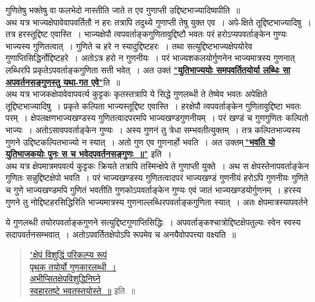 \documentclass[11pt, openany]{book}
\begin{document}
\newpage%

\noindent गुणितेषु भक्तेषु वा फलभेदो नास्तीति जाते त एव गुणाप्ती उद्दिष्टभाज्यादिष्वपीति~॥ \\

\vspace{-3mm}
 अथ यत्र भाज्यक्षेपावेवापवर्तितौ न हरः तत्रापि तदुथ्ये गुणाप्ती तेषु 
युक्त एव~। अपे-क्षिते तूद्दिष्टभाज्यादिषु~। तत्र हरस्तूद्दिष्ट एवास्ति~।
भाज्यक्षेपौ त्वपवर्ताङ्कगुणितावुद्दिष्टौ भवतः परं हरोऽप्यपवर्ताङ्केन गुण्यः
भाज्यस्य गुणितत्वात्~। गुणिते च हरे न स्यादुद्दिष्टहरः~। तथा सत्युद्दिष्टभाज्यक्षेपयोरेव 
गुणाप्तिसिद्धिर्नोद्दिष्टहरे~। अतोऽत्र हरो न गुणनीयः~। परं भाज्यशकलयोर्गुणनेन भाज्यमात्रस्य गुणनात् लब्धिरपि प्रकृतेऽपवर्ताङ्कगुणिता सती भवेत्~। अत उक्तं \hyperref[30]{\textbf{"युतिभाज्ययोः समपवर्तितयोर्या लब्धिः सा अपवर्तनसङ्गुणस्तु यथा-गत एवे"}}ति~॥ \\

\vspace{-3mm}
 अथ यत्र भाजकक्षेपावेवापवर्त्य कुट्टकः कृतस्तत्रापि ये सिद्धे गुणलब्धी 
ते तेष्वेव भवतः अपेक्षिते तूद्दिष्टभाज्यादिषु~। प्रकृते कल्पिता
भाज्यस्तूद्दिष्ट एवास्ति~। हरक्षेपौ त्वपवर्ताङ्केन गुणितावुद्दिष्टा भवतः परम्~।
क्षेपलक्षणभाज्यखण्डस्य गुणितत्वादपरमपि भाज्यखण्डगुणनीयम्~। परं खण्डं च गुणगुणितः कल्पितो भाज्यः~। अतोऽसावपवर्ताङ्केन गुण्यः~। अस्य गुणनं तु त्रेधा
सम्भवतीत्युक्तम्~। तत्र कल्पितभाज्यस्य गुणने उद्दिष्टकल्पितभाज्यो न
स्यात्~। अतो गुण एव गुणनार्हो भवति~। अत उक्तम्\textendash \,\hyperref[30]{\textbf{"भवति यो युतिभाजकयोः पुनः स च भवेदपवर्तनसङ्गुणः~॥"}} इति~। \\

\vspace{-3mm}
 अथ यत्र क्षेपमात्रमपवर्त्य कुट्टकः क्रियते तत्रापि तस्मिन्क्षेपे ते 
गुणाप्ती युक्ते~। अथ स क्षेपस्तेनापवर्ताङ्केन गुणितः सन्नुद्दिष्टक्षेपो भवति~। 
परं भाज्यखण्डस्य गुणितत्वादपरं भाज्यखण्डं गुणनीयं हरोऽपि गुणनीयः 
गुणिते च गुणे भाज्यखण्डमपि गुणितं भवतीति गुणकोऽपवर्ताङ्केन गुण्यः 
एवं जातं भाज्यखण्डयोर्गुणनम्~। हरस्य गुणने तु नोद्दिष्टहरसिद्धिरिति 
भाज्यमात्रस्य गुणनाल्लब्धिरपवर्ताङ्कगुणिता स्यात्~। अतः क्षेपमात्रस्यापवर्तने 

\newpage

\noindent ये गुणलब्धी तयोरपवर्ताङ्कगुणने सत्युद्दिष्टगुणाप्तिसिद्धिः~।
अपवर्ताङ्कश्चात्रोद्दिष्टक्षेपतुल्यः स्वेन स्वस्य सदापवर्तनसम्भवात्~।
अतोऽपवर्तितक्षेपोऽपि रूपमेव च अनयैवोपपत्त्या वक्ष्यति~॥ 

\begin{quote}
\hyperref[35]{"क्षेपं विशुद्धिं परिकल्प्य रूपं \\
पृथक् तयोर्यो गुणकारलब्धी~। \\
अभीप्सितक्षेपविशुद्धिनिघ्ने \\
स्वहारतष्टे भवतस्तयोस्ते~॥} इति~॥ 
\end{quote}
\end{document}
